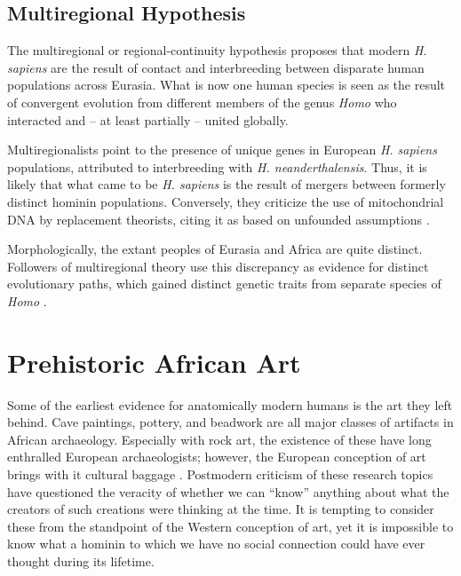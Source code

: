 \documentclass[american]{../../../coursework}
\begin{document}
\subsection{Multiregional Hypothesis}

The multiregional or regional-continuity hypothesis proposes that modern
\emph{H. sapiens} are the result of contact and interbreeding between
disparate human populations across Eurasia. What is now one human species is
seen as the result of convergent evolution from different members of the genus
\emph{Homo} who interacted and -- at least partially -- united globally.

Multiregionalists point to the presence of unique genes in European
\emph{H. sapiens} populations, attributed to interbreeding with
\emph{H. neanderthalensis}. Thus, it is likely that what came to be
\emph{H. sapiens} is the result of mergers between formerly distinct hominin
populations. Conversely, they criticize the use of mitochondrial DNA by
replacement theorists, citing it as based on unfounded assumptions
\parencite{Kendrick2014}.

Morphologically, the extant peoples of Eurasia and Africa are quite distinct.
Followers of multiregional theory use this discrepancy as evidence for
distinct evolutionary paths, which gained distinct genetic traits from
separate species of \emph{Homo} \parencite{Kendrick2014}.

\section{Prehistoric African Art}

Some of the earliest evidence for anatomically modern humans is the art they
left behind. Cave paintings, pottery, and beadwork are all major classes of
artifacts in African archaeology. Especially with rock art, the existence of
these have long enthralled European archaeologists; however, the European
conception of art brings with it cultural baggage \parencite{Arnaut1991}.
Postmodern criticism of these research topics have questioned the veracity of
whether we can ``know'' anything about what the creators of such creations
were thinking at the time. It is tempting to consider these from the
standpoint of the Western conception of art, yet it is impossible to know what
a hominin to which we have no social connection could have ever thought during
its lifetime.

\printbibliography
\end{document}
